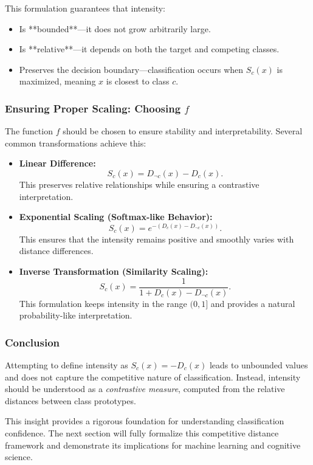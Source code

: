 This formulation guarantees that intensity:

\begin{itemize}
    \item Is **bounded**—it does not grow arbitrarily large.
    \item Is **relative**—it depends on both the target and competing classes.
    \item Preserves the decision boundary—classification occurs when \( S_c(x) \) is maximized, meaning \( x \) is closest to class \( c \).
\end{itemize}

\subsubsection{Ensuring Proper Scaling: Choosing \( f \)}

The function \( f \) should be chosen to ensure stability and interpretability. Several common transformations achieve this:

\begin{itemize}
    \item \textbf{Linear Difference:}  
    \[
    S_c(x) = D_{\neg c}(x) - D_c(x).
    \]
    This preserves relative relationships while ensuring a contrastive interpretation.
    
    \item \textbf{Exponential Scaling (Softmax-like Behavior):}  
    \[
    S_c(x) = e^{-(D_c(x) - D_{\neg c}(x))}.
    \]
    This ensures that the intensity remains positive and smoothly varies with distance differences.
    
    \item \textbf{Inverse Transformation (Similarity Scaling):}  
    \[
    S_c(x) = \frac{1}{1 + D_c(x) - D_{\neg c}(x)}.
    \]
    This formulation keeps intensity in the range \( (0,1] \) and provides a natural probability-like interpretation.
\end{itemize}

\subsubsection{Conclusion}

Attempting to define intensity as \( S_c(x) = -D_c(x) \) leads to unbounded values and does not capture the competitive nature of classification. Instead, intensity should be understood as a \textit{contrastive measure}, computed from the relative distances between class prototypes.


This insight provides a rigorous foundation for understanding classification confidence. The next section will fully formalize this competitive distance framework and demonstrate its implications for machine learning and cognitive science.